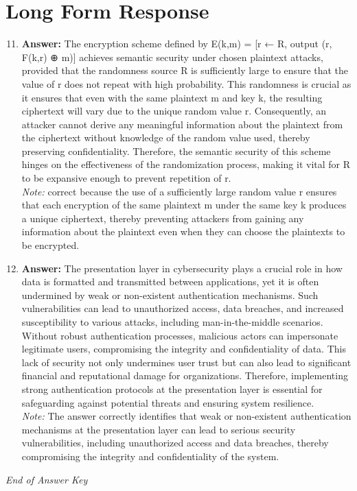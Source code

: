 \documentclass[12pt]{article}
\begin{document}
\section*{Long Form Response}
\begin{enumerate}[label=\arabic*.]
\setcounter{enumi}{10}
\item \textbf{Answer:} The encryption scheme defined by E(k,m) = [r ← R, output (r, F(k,r) ⊕ m)] achieves semantic security under chosen plaintext attacks, provided that the randomness source R is sufficiently large to ensure that the value of r does not repeat with high probability. This randomness is crucial as it ensures that even with the same plaintext m and key k, the resulting ciphertext will vary due to the unique random value r. Consequently, an attacker cannot derive any meaningful information about the plaintext from the ciphertext without knowledge of the random value used, thereby preserving confidentiality. Therefore, the semantic security of this scheme hinges on the effectiveness of the randomization process, making it vital for R to be expansive enough to prevent repetition of r.
\\ \textit{Note:} correct because the use of a sufficiently large random value r ensures that each encryption of the same plaintext m under the same key k produces a unique ciphertext, thereby preventing attackers from gaining any information about the plaintext even when they can choose the plaintexts to be encrypted.
\item \textbf{Answer:} The presentation layer in cybersecurity plays a crucial role in how data is formatted and transmitted between applications, yet it is often undermined by weak or non-existent authentication mechanisms. Such vulnerabilities can lead to unauthorized access, data breaches, and increased susceptibility to various attacks, including man-in-the-middle scenarios. Without robust authentication processes, malicious actors can impersonate legitimate users, compromising the integrity and confidentiality of data. This lack of security not only undermines user trust but can also lead to significant financial and reputational damage for organizations. Therefore, implementing strong authentication protocols at the presentation layer is essential for safeguarding against potential threats and ensuring system resilience.
\\ \textit{Note:} The answer correctly identifies that weak or non-existent authentication mechanisms at the presentation layer can lead to serious security vulnerabilities, including unauthorized access and data breaches, thereby compromising the integrity and confidentiality of the system.
\end{enumerate}

\vfill
\noindent\textit{End of Answer Key}
\end{document}
